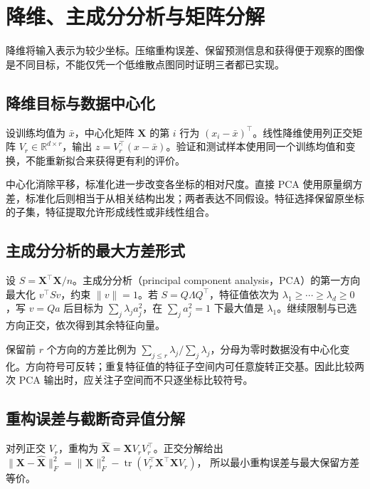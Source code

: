 \setcounter{chapter}{14} %
\chapter{降维、主成分分析与矩阵分解}
\label{chap:ml-dimension}

降维将输入表示为较少坐标。压缩重构误差、保留预测信息和获得便于观察的图像是不同目标，不能仅凭一个低维散点图同时证明三者都已实现。

\section{降维目标与数据中心化}

设训练均值为 $\bar x$，中心化矩阵 $\mathbf X$ 的第 $i$ 行为 $(x_i-\bar x)^\top$。线性降维使用列正交矩阵 $V_r\in\mathbb R^{d\times r}$，输出 $z=V_r^\top(x-\bar x)$。验证和测试样本使用同一个训练均值和变换，不能重新拟合来获得更有利的评价。

中心化消除平移，标准化进一步改变各坐标的相对尺度。直接 PCA 使用原量纲方差，标准化后则相当于从相关结构出发；两者表达不同假设。特征选择保留原坐标的子集，特征提取允许形成线性或非线性组合。

\section{主成分分析的最大方差形式}

设 $S=\mathbf X^\top\mathbf X/n$。主成分分析（principal component analysis，PCA）的第一方向最大化 $v^\top Sv$，约束 $\|v\|=1$。若 $S=Q\Lambda Q^\top$，特征值依次为 $\lambda_1\geq\cdots\geq\lambda_d\geq0$，写 $v=Qa$ 后目标为 $\sum_j\lambda_ja_j^2$，在 $\sum_ja_j^2=1$ 下最大值是 $\lambda_1$。继续限制与已选方向正交，依次得到其余特征向量。

保留前 $r$ 个方向的方差比例为 $\sum_{j\leq r}\lambda_j/\sum_j\lambda_j$，分母为零时数据没有中心化变化。方向符号可反转；重复特征值的特征子空间内可任意旋转正交基。因此比较两次 PCA 输出时，应关注子空间而不只逐坐标比较符号。

\section{重构误差与截断奇异值分解}

对列正交 $V_r$，重构为 $\widehat{\mathbf X}=\mathbf XV_rV_r^\top$。正交分解给出
$\|\mathbf X-\widehat{\mathbf X}\|_F^2=\|\mathbf X\|_F^2-\operatorname{tr}(V_r^\top\mathbf X^\top\mathbf XV_r)$，
所以最小重构误差与最大保留方差等价。

